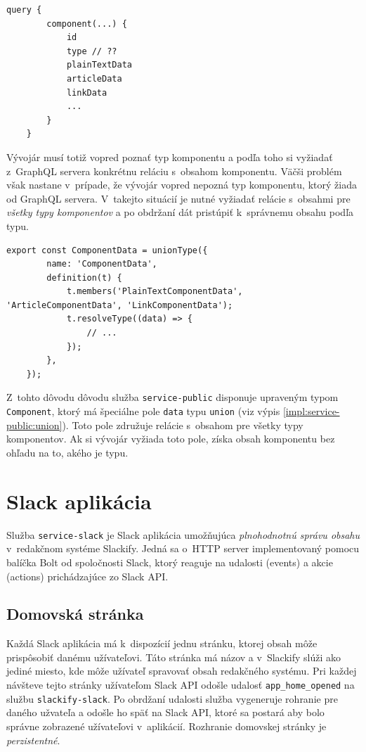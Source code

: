 \begin{lstlisting}[caption={Príklad získania obsahu komponentu pred optimalizáciou.}]
	query {
		component(...) {
			id
			type // ??
			plainTextData
			articleData
			linkData
			...
		}
	}
\end{lstlisting}

\medskip

\noindent Vývojár musí totiž vopred poznať typ komponentu a podľa toho si vyžiadať z~GraphQL servera konkrétnu reláciu s~obsahom komponentu. Väčši problém však nastane v~prípade, že vývojár vopred nepozná typ komponentu, ktorý žiada od GraphQL servera. V~takejto situácií je nutné vyžiadať relácie s~obsahmi pre \emph{všetky typy komponentov} a po obdržaní dát pristúpiť k~správnemu obsahu podľa typu. \\

\begin{lstlisting}[caption={Definícia union typu pre dáta komponentu.}, label={impl:service-public:union}]
	export const ComponentData = unionType({
		name: 'ComponentData',
		definition(t) {
			t.members('PlainTextComponentData', 'ArticleComponentData', 'LinkComponentData');
			t.resolveType((data) => {
				// ...
			});
		},
	});
\end{lstlisting}

\medskip

\noindent Z~tohto dôvodu dôvodu služba \texttt{service-public} disponuje upraveným typom \texttt{Component}, ktorý má špeciálne pole \texttt{data} typu \texttt{union} (viz výpis \ref{impl:service-public:union}). Toto pole združuje relácie s~obsahom pre všetky typy komponentov. Ak si vývojár vyžiada toto pole, získa obsah komponentu bez ohľadu na to, akého je typu.

\section{Slack aplikácia}
\label{impl:slack_app}
Služba \texttt{service-slack} je Slack aplikácia umožňujúca \emph{plnohodnotnú správu obsahu} v~redakčnom systéme Slackify. Jedná sa o~HTTP server implementovaný pomocu balíčka Bolt od spoločnosti Slack, ktorý reaguje na udalosti (events) a akcie (actions) prichádzajúce zo Slack API.

\subsection{Domovská stránka}
Každá Slack aplikácia má k~dispozícií jednu stránku, ktorej obsah môže prispôsobiť danému užívateľovi. Táto stránka má názov  a v~Slackify slúži ako jediné miesto, kde môže užívateľ spravovať obsah redakčného systému. Pri každej návšteve tejto stránky užívateľom Slack API odošle udalosť \texttt{app\_home\_opened} na službu \texttt{slackify-slack}. Po obrdžaní udalosti služba vygeneruje rohranie pre daného užvateľa a odošle ho späť na Slack API, ktoré sa postará aby bolo správne zobrazené užívateľovi v~aplikácií. Rozhranie domovskej stránky je \emph{perzistentné}. \\

